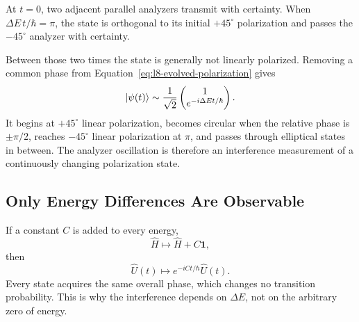 At \(t=0\), two adjacent parallel analyzers transmit with certainty. When
\(\Delta E\,t/\hbar=\pi\), the state is orthogonal to its initial
\(+45^\circ\) polarization and passes the \(-45^\circ\) analyzer with
certainty.

Between those two times the state is generally not linearly polarized.
Removing a common phase from
Equation~\eqref{eq:l8-evolved-polarization} gives
\begin{equation}
  \left\lvert\psi(t)\right\rangle
  \sim
  \frac{1}{\sqrt2}
  \begin{pmatrix}
    1\\
    e^{-i\Delta E t/\hbar}
  \end{pmatrix}.
  \label{eq:l8-relative-polarization-phase}
\end{equation}
It begins at \(+45^\circ\) linear polarization, becomes circular when the
relative phase is \(\pm\pi/2\), reaches \(-45^\circ\) linear polarization at
\(\pi\), and passes through elliptical states in between. The analyzer
oscillation is therefore an interference measurement of a continuously
changing polarization state.

\subsection{Only Energy Differences Are Observable}

If a constant \(C\) is added to every energy,
\begin{equation}
  \hat H\longmapsto\hat H+C\mathbf1,
\end{equation}
then
\begin{equation}
  \hat U(t)
  \longmapsto
  e^{-iCt/\hbar}\hat U(t).
\end{equation}
Every state acquires the same overall phase, which changes no transition
probability. This is why the interference depends on \(\Delta E\), not on the
arbitrary zero of energy.

\begin{classroomqa}
\end{classroomqa}

\begin{classroomqa}
\end{classroomqa}

